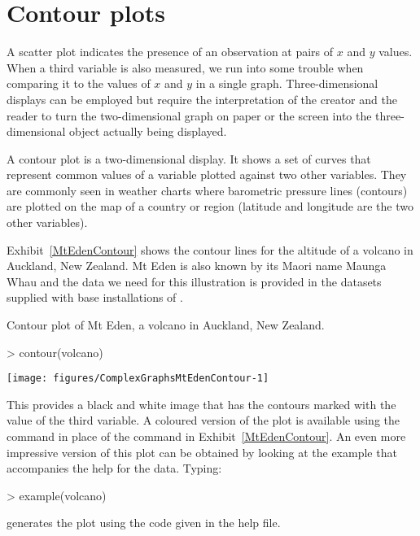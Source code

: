 \section{Contour plots}

A scatter plot indicates the presence of an observation at pairs of $x$ and $y$ values. When a third variable is also measured, we run into some trouble when comparing it to the values of $x$ and $y$ in a single graph. Three-dimensional displays can be employed but require the interpretation of the creator and the reader to turn the two-dimensional graph on paper or the screen into the three-dimensional object actually being displayed.

A contour plot is a two-dimensional display. It shows a set of curves that represent common values of a variable plotted against two other variables. They are commonly seen in weather charts where barometric pressure lines (contours) are plotted on the map of a country or region (latitude and longitude are the two other variables).

Exhibit~\ref{MtEdenContour} shows the contour lines for the altitude of a volcano in Auckland, New Zealand. Mt Eden is also known by its Maori name Maunga Whau and the data we need for this illustration is provided in the datasets supplied with base installations of \R{}.
\begin{exhibit}
\begin{center}
\caption{Contour plot of Mt Eden, a volcano in Auckland, New Zealand.}
\label{MtEdenContour}
\begin{Schunk}
\begin{Sinput}
> contour(volcano)
\end{Sinput}

\texttt{[image: figures/ComplexGraphsMtEdenContour-1]} \end{Schunk}
\end{center}
\end{exhibit}

This provides a black and white image that has the contours marked with the value of the third variable. A coloured version of the plot is available using the  command in place of the  command in Exhibit~\ref{MtEdenContour}. An even more impressive version of this plot can be obtained by looking at the example that accompanies the help for the  data. Typing:
\begin{Schunk}
\begin{Sinput}
> example(volcano)
\end{Sinput}
\end{Schunk}
generates the plot using the code given in the help file.


